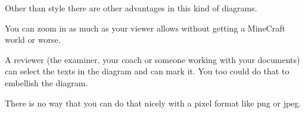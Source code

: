 Other than style there are other advantages in this kind of diagrams.
\begin{Itemize}
\item You can zoom in as much as your viewer allows without getting a MineCraft world or worse.
\item A reviewer (the examiner, your coach or someone working with your documents) can select the texts in the diagram and can mark it. You too could do that to embellish the diagram.
\item There is no way that you can do that nicely with a pixel format like png or jpeg.
\end{Itemize}

